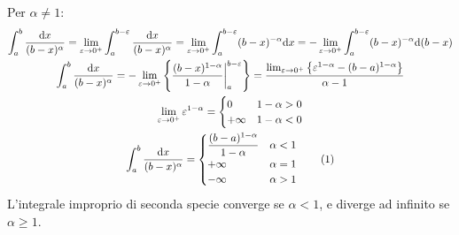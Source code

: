 \documentclass{article}
\numberwithin{equation}{subsection}
\newcommand{\tageq}{\tag{\stepcounter{equation}\theequation}}
\begin{document}
Per $\alpha\neq1$:
\begin{gather*}
    \displaystyle\int_a^b\frac{\mathrm{d}x}{(b-x)^\alpha}=
    \lim_{\varepsilon\to0^+}\displaystyle\int_a^{b-\varepsilon}\frac{\mathrm{d}x}{(b-x)^{\alpha}}=
    \lim_{\varepsilon\to0^+}\displaystyle\int_a^{b-\varepsilon}(b-x)^{-\alpha}\mathrm{d}x=
    -\lim_{\varepsilon\to0^+}\int_a^{b-\varepsilon}(b-x)^{-\alpha}\mathrm{d}(b-x)\\
    \displaystyle\int_a^b\frac{\mathrm{d}x}{(b-x)^\alpha}=
    -\lim_{\varepsilon\to0^+}\left\{\frac{(b-x)^{1-\alpha}}{1-\alpha}\bigg|_a^{b-\varepsilon}\right\}=
    \frac{\lim_{\varepsilon\to0^+}\left\{\varepsilon^{1-\alpha}-(b-a)^{1-\alpha}\right\}}{\alpha-1}\\
    \lim_{\varepsilon\to0^+}\varepsilon^{1-\alpha}=\begin{cases}
        0&1-\alpha>0\\
        +\infty&1-\alpha<0
    \end{cases}\\
    \displaystyle\int_a^b\frac{\mathrm{d}x}{(b-x)^\alpha}=\begin{cases}
        \displaystyle\frac{(b-a)^{1-\alpha}}{1-\alpha}&\alpha<1\\
        +\infty&\alpha=1\\
        -\infty&\alpha>1
    \end{cases}\tageq
\end{gather*}
L'integrale improprio di seconda specie converge se $\alpha<1$, e diverge ad infinito se $\alpha\geq1$. 
\end{document}
